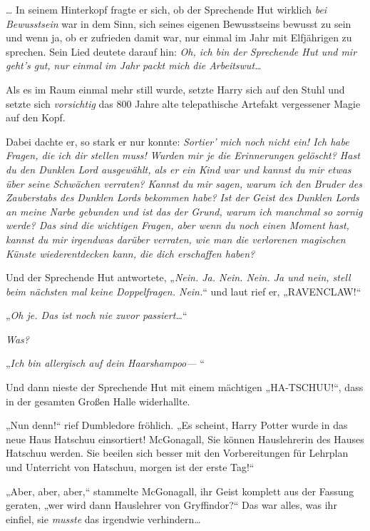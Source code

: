 {\later

… In seinem Hinterkopf fragte er sich, ob der Sprechende Hut wirklich \emph{bei Bewusstsein} war in dem Sinn, sich seines eigenen Bewusstseins bewusst zu sein und wenn ja, ob er zufrieden damit war, nur einmal im Jahr mit Elfjährigen zu sprechen. Sein Lied deutete darauf hin: \emph{Oh, ich bin der Sprechende Hut und mir geht's gut,} \emph{nur} \emph{einmal im Jahr} \emph{packt mich} \emph{die Arbeitswut…}

Als es im Raum einmal mehr still wurde, setzte Harry sich auf den Stuhl und setzte sich \emph{vorsichtig} das 800 Jahre alte telepathische Artefakt vergessener Magie auf den Kopf.

Dabei dachte er, so stark er nur konnte: \emph{Sortier' mich noch nicht ein! Ich habe Fragen, die ich dir stellen muss! Wurden mir je die Erinnerungen gelöscht? Hast du den Dunklen Lord ausgewählt, als er ein Kind war und kannst du mir etwas über seine Schwächen verraten? Kannst du mir sagen, warum ich den Bruder des Zauberstabs des Dunklen Lords bekommen habe? Ist der Geist des Dunklen Lords an meine Narbe gebunden und ist das der Grund, warum ich manchmal so zornig werde? Das sind die wichtigen Fragen, aber wenn du noch einen Moment hast, kannst du mir irgendwas darüber verraten, wie man die verlorenen magischen Künste wiederentdecken kann, die dich erschaffen haben?}

Und der Sprechende Hut antwortete, „\emph{Nein. Ja. Nein. Nein. Ja und nein, stell beim nächsten mal keine Doppelfragen. Nein.}“ und laut rief er, „RAVENCLAW!“

\later

„\emph{Oh je. Das ist noch nie zuvor passiert…}“

\emph{Was?}

„\emph{Ich bin allergisch auf dein Haarshampoo—} “

Und dann nieste der Sprechende Hut mit einem mächtigen „HA-TSCHUU!“, dass in der gesamten Großen Halle widerhallte.

„Nun denn!“ rief Dumbledore fröhlich. „Es scheint, Harry Potter wurde in das neue Haus Hatschuu einsortiert! McGonagall, Sie können Hauslehrerin des Hauses Hatschuu werden. Sie beeilen sich besser mit den Vorbereitungen für Lehrplan und Unterricht von Hatschuu, morgen ist der erste Tag!“

„Aber, aber, aber,“ stammelte McGonagall, ihr Geist komplett aus der Fassung geraten, „wer wird dann Hauslehrer von Gryffindor?“ Das war alles, was ihr einfiel, sie \emph{musste} das irgendwie verhindern…

}
